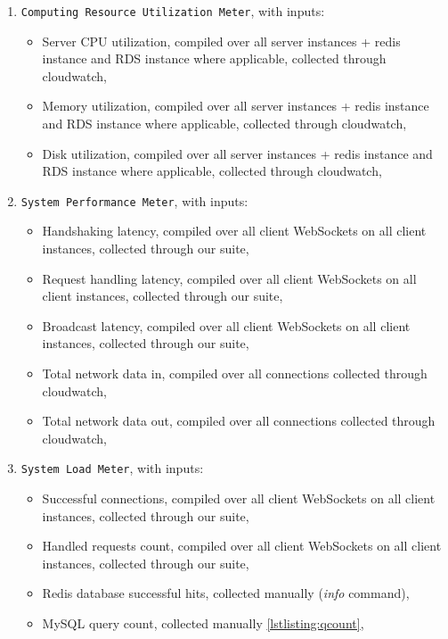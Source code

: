 \documentclass{uvamscse}
\begin{document}
\begin{enumerate}
  \item \texttt{Computing Resource Utilization Meter}, with inputs:
    \begin{itemize}
      \item Server CPU utilization, compiled over all server instances + redis instance and RDS instance where applicable, collected through cloudwatch,
      \item Memory utilization, compiled over all server instances + redis instance and RDS instance where applicable, collected through cloudwatch,
      \item Disk utilization, compiled over all server instances + redis instance and RDS instance where applicable, collected through cloudwatch,
    \end{itemize}
  \item \texttt{System Performance Meter}, with inputs:
    \begin{itemize}
      \item Handshaking latency, compiled over all client WebSockets on all client instances, collected through our suite,
      \item Request handling latency, compiled over all client WebSockets on all client instances, collected through our suite,
      \item Broadcast latency, compiled over all client WebSockets on all client instances, collected through our suite,
      \item Total network data in, compiled over all connections collected through cloudwatch,
      \item Total network data out, compiled over all connections collected through cloudwatch,
    \end{itemize}
  \item \texttt{System Load Meter}, with inputs:
    \begin{itemize}
      \item Successful connections, compiled over all client WebSockets on all client instances, collected through our suite,
      \item Handled requests count, compiled over all client WebSockets on all client instances, collected through our suite,
      \item Redis database successful hits, collected manually (\textit{info} command),
      \item MySQL query count, collected manually \ref{lstlisting:qcount},
    \end{itemize}

\end{enumerate}
\end{document}
